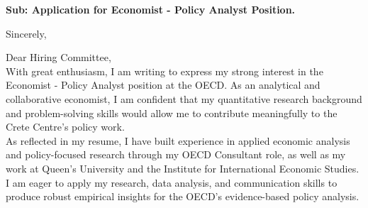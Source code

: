 \documentclass[11pt,a4paper,roman]{moderncv}
\begin{document}
\date{\today}
\opening{\textbf{Sub: Application for Economist - Policy Analyst Position.}}
\closing{Sincerely, \vspace{-1em}}


\makelettertitle



Dear Hiring Committee,
\\
\vspace{1em}
With great enthusiasm, I am writing to express my strong interest in the Economist - Policy Analyst position at the OECD. As an analytical and collaborative economist, I am confident that my quantitative research background and problem-solving skills would allow me to contribute meaningfully to the Crete Centre's policy work.\\

\vspace{1em}
As reflected in my resume, I have built experience in applied economic analysis and policy-focused research through my OECD Consultant role, as well as my work at Queen's University and the Institute for International Economic Studies. I am eager to apply my research, data analysis, and communication skills to produce robust empirical insights for the OECD's evidence-based policy analysis.\\
\vspace{1em}
\end{document}
